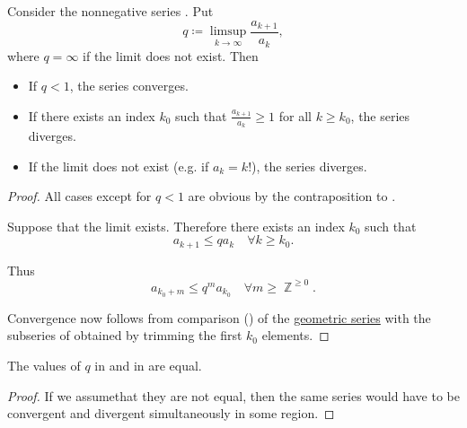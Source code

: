 \begin{proposition}\label{thm:dalamberts_ratio_test}\mcite\cite[thm. 3.33]{Rudin1976}
  Consider the nonnegative series . Put
  \begin{equation*}
    q \coloneqq \limsup_{k \to \infty} \frac {a_{k+1}} {a_k},
  \end{equation*}
  where \( q = \infty \) if the limit does not exist. Then
  \begin{itemize}
    \item If \( q < 1 \), the series converges.
    \item If there exists an index \( k_0 \) such that \( \frac {a_{k+1}} {a_k} \geq 1 \) for all \( k \geq k_0 \), the series diverges.
    \item If the limit does not exist (e.g. if \( a_k = k! \)), the series diverges.
  \end{itemize}
\end{proposition}
\begin{proof}
  All cases except for \( q < 1 \) are obvious by the contraposition to .

  Suppose that the limit exists. Therefore there exists an index \( k_0 \) such that
  \begin{equation*}
    a_{k+1} \leq q a_k \quad\forall k \geq k_0.
  \end{equation*}

  Thus
  \begin{equation*}
    a_{k_0 + m} \leq q^m a_{k_0} \quad\forall m \geq \BbbZ^{\geq 0}.
  \end{equation*}

  Convergence now follows from comparison () of the \hyperref[def:geometric_progression/series]{geometric series} with the subseries of  obtained by trimming the first \( k_0 \) elements.
\end{proof}

\begin{proposition}\label{rem:nonnegative_series_convergence_test_equivalence}
  The values of \( q \) in  and in  are equal.
\end{proposition}
\begin{proof}
  If we assume\LEM that they are not equal, then the same series would have to be convergent and divergent simultaneously in some region.
\end{proof}

